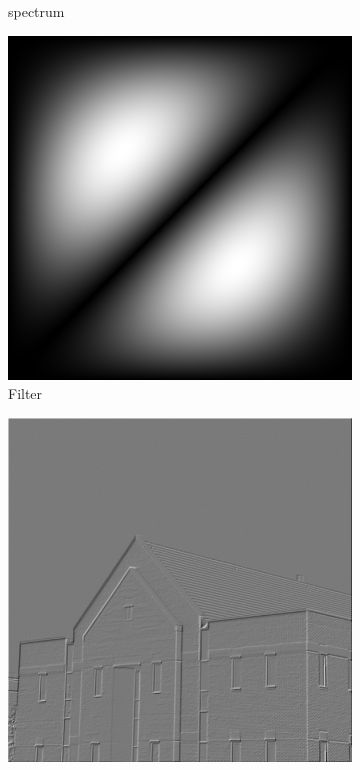 \documentclass[
	12pt, %
]{style/fphw}
\begin{document}
\begin{figure}[H]
\begin{subfigure}[b]{0.45\textwidth}
         \caption{spectrum}
         \label{Q5_1_spectrum.png}
     \end{subfigure}
     \vfill
     \begin{subfigure}[b]{0.45\textwidth}
         \centering
         \includegraphics[width=\textwidth]{Q5_1_filter.png}
         \caption{Filter}
         \label{Q5_1_filter.png}
     \end{subfigure}
     \hfill
     \begin{subfigure}[b]{0.45\textwidth}
         \centering
         \includegraphics[width=\textwidth]{Q5_1_frequency.png}

\end{subfigure}
\end{figure}
\end{document}
